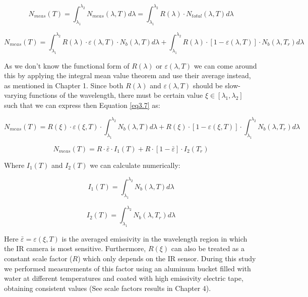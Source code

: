 		\begin{equation}\label{eq3.6}
			N_{meas}(T)= \int_{\lambda_{1}}^{\lambda_{2}} N_{meas}(\lambda,T) d\lambda = \int_{\lambda_{1}}^{\lambda_{2}} R(\lambda) \cdot N_{total}(\lambda,T) d\lambda
		\end{equation}		
		
		\begin{equation}\label{eq3.7}
			N_{meas}(T)= \int_{\lambda_{1}}^{\lambda_{2}} R(\lambda) \cdot \varepsilon(\lambda,T) \cdot N_{b}(\lambda,T) d\lambda + \int_{\lambda_{1}}^{\lambda_{2}} R(\lambda) \cdot [1- \varepsilon(\lambda,T)] \cdot N_{b}(\lambda,T_{r}) d\lambda
		\end{equation}	
		
		As we don't know the functional form of $R(\lambda)$ or $\varepsilon(\lambda,T)$ we can come around this by applying the integral mean value theorem and use their average instead, as mentioned in Chapter 1. Since both $R(\lambda)$ and $\varepsilon(\lambda,T)$ should be slow-varying functions of the wavelength, there must be certain value $\xi\in [\lambda_{1},\lambda_{2}]$ such that we can express then Equation \ref{eq3.7} as:
		
		\begin{equation}\label{eq3.8}
			N_{meas}(T)= R(\xi) \cdot \varepsilon(\xi,T) \cdot \int_{\lambda_{1}}^{\lambda_{2}} N_{b}(\lambda,T) d\lambda + R(\xi) \cdot [1- \varepsilon(\xi,T)] \cdot \int_{\lambda_{1}}^{\lambda_{2}} N_{b}(\lambda,T_{r}) d\lambda
		\end{equation}	
		
		\begin{equation}\label{eq3.9}
			N_{meas}(T)= R \cdot \bar{\varepsilon} \cdot I_{1}(T) + R \cdot [1- \bar{\varepsilon}] \cdot I_{2}(T_{r})
		\end{equation}
		
		Where $I_{1}(T)$ and $I_{2}(T)$ we can calculate numerically:
		
		\begin{equation}\label{eq3.10}
			I_{1}(T)=\int_{\lambda_{1}}^{\lambda_{2}} N_{b}(\lambda,T) d\lambda
		\end{equation}
		
		\begin{equation}\label{eq3.11}
			I_{2}(T)=\int_{\lambda_{1}}^{\lambda_{2}} N_{b}(\lambda,T_{r}) d\lambda
		\end{equation}
		
		Here $\bar{\varepsilon}=\varepsilon(\xi,T)$ is the averaged emissivity in the wavelength region in which the IR camera is most sensitive. Furthermore, $R(\xi)$ can also be treated as a constant scale factor ($R$) which only depends on the IR sensor. During this study we performed measurements of this factor using an aluminum bucket filled with water at different temperatures and coated with high emissivity electric tape, obtaining consistent values (See scale factors results in Chapter 4).
		
